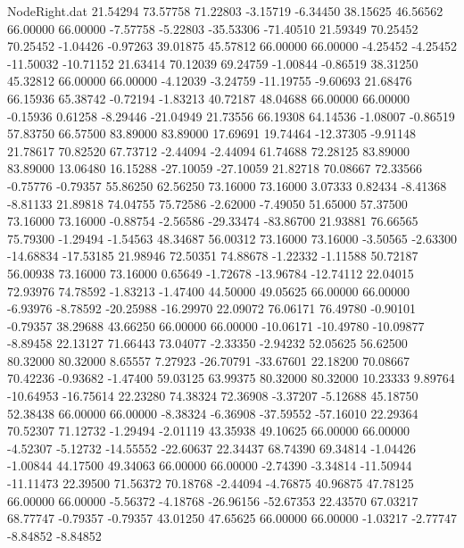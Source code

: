 \begin{filecontents}{NodeRight.dat}
  21.54294   73.57758   71.22803    -3.15719   -6.34450   38.15625   46.56562   66.00000   66.00000   -7.57758   -5.22803  -35.53306  -71.40510
  21.59349   70.25452   70.25452    -1.04426   -0.97263   39.01875   45.57812   66.00000   66.00000   -4.25452   -4.25452  -11.50032  -10.71152
  21.63414   70.12039   69.24759    -1.00844   -0.86519   38.31250   45.32812   66.00000   66.00000   -4.12039   -3.24759  -11.19755   -9.60693
  21.68476   66.15936   65.38742    -0.72194   -1.83213   40.72187   48.04688   66.00000   66.00000   -0.15936    0.61258   -8.29446  -21.04949
  21.73556   66.19308   64.14536    -1.08007   -0.86519   57.83750   66.57500   83.89000   83.89000   17.69691   19.74464  -12.37305   -9.91148
  21.78617   70.82520   67.73712    -2.44094   -2.44094   61.74688   72.28125   83.89000   83.89000   13.06480   16.15288  -27.10059  -27.10059
  21.82718   70.08667   72.33566    -0.75776   -0.79357   55.86250   62.56250   73.16000   73.16000    3.07333    0.82434   -8.41368   -8.81133
  21.89818   74.04755   75.72586    -2.62000   -7.49050   51.65000   57.37500   73.16000   73.16000   -0.88754   -2.56586  -29.33474  -83.86700
  21.93881   76.66565   75.79300    -1.29494   -1.54563   48.34687   56.00312   73.16000   73.16000   -3.50565   -2.63300  -14.68834  -17.53185
  21.98946   72.50351   74.88678    -1.22332   -1.11588   50.72187   56.00938   73.16000   73.16000    0.65649   -1.72678  -13.96784  -12.74112
  22.04015   72.93976   74.78592    -1.83213   -1.47400   44.50000   49.05625   66.00000   66.00000   -6.93976   -8.78592  -20.25988  -16.29970
  22.09072   76.06171   76.49780    -0.90101   -0.79357   38.29688   43.66250   66.00000   66.00000  -10.06171  -10.49780  -10.09877   -8.89458
  22.13127   71.66443   73.04077    -2.33350   -2.94232   52.05625   56.62500   80.32000   80.32000    8.65557    7.27923  -26.70791  -33.67601
  22.18200   70.08667   70.42236    -0.93682   -1.47400   59.03125   63.99375   80.32000   80.32000   10.23333    9.89764  -10.64953  -16.75614
  22.23280   74.38324   72.36908    -3.37207   -5.12688   45.18750   52.38438   66.00000   66.00000   -8.38324   -6.36908  -37.59552  -57.16010
  22.29364   70.52307   71.12732    -1.29494   -2.01119   43.35938   49.10625   66.00000   66.00000   -4.52307   -5.12732  -14.55552  -22.60637
  22.34437   68.74390   69.34814    -1.04426   -1.00844   44.17500   49.34063   66.00000   66.00000   -2.74390   -3.34814  -11.50944  -11.11473
  22.39500   71.56372   70.18768    -2.44094   -4.76875   40.96875   47.78125   66.00000   66.00000   -5.56372   -4.18768  -26.96156  -52.67353
  22.43570   67.03217   68.77747    -0.79357   -0.79357   43.01250   47.65625   66.00000   66.00000   -1.03217   -2.77747   -8.84852   -8.84852

\end{filecontents}
